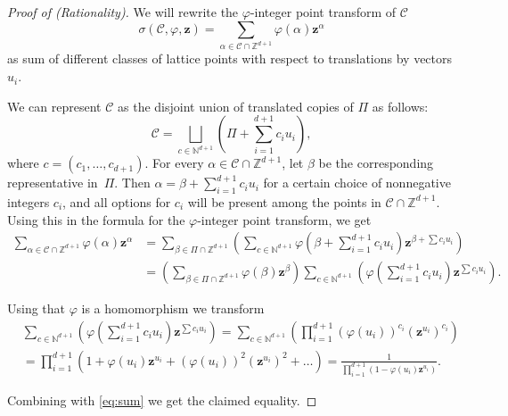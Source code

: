 \documentclass[12pt,reqno]{amsart}
\theoremstyle{definition}
\theoremstyle{remark}
\newcommand{\N}{\mathbb{N}}
\newcommand{\Z}{\mathbb{Z}}
\renewcommand{\phi}{\varphi}
\begin{document}
\begin{proof}[Proof of  (Rationality)] 

We will rewrite the $\phi$-integer point transform of $\mathcal C$ 
$$\sigma(\mathcal C,\phi, \mathbf z)=\sum_{\alpha\in \mathcal C\cap \Z^{d+1}}\phi(\alpha)\mathbf z^{\alpha}$$
as sum of different classes of lattice points with respect to translations by vectors $u_i$.

We can represent $\mathcal C$ as the disjoint union of translated copies of $\Pi$ as follows: 
$$\mathcal C=\bigsqcup_{c\in \N^{d+1}}\left(\Pi+\sum_{i=1}^{d+1} c_iu_i\right),$$ where $c = (c_1,\dots,c_{d+1})$. For every $\alpha\in \mathcal{C}\cap \Z^{d+1}$, let $\beta$ be the corresponding representative in~$\Pi$. Then 
$\alpha=\beta+\sum_{i=1}^{d+1} c_i u_i$
for a certain choice of nonnegative integers $c_i$, and all options for $c_i$ will be present among the points in $\mathcal C\cap \Z^{d+1}$. Using this in the formula for the $\phi$-integer point transform, we get
\begin{equation}\label{eq:sum}\begin{aligned}
    \sum_{\alpha\in \mathcal C\cap \Z^{d+1}}\phi(\alpha)\mathbf z^\alpha &= \sum_{\beta\in \Pi\cap \Z^{d+1}}\left(\sum_{c\in \N^{d+1}}\phi\left(\beta + \sum_{i=1}^{d+1} c_iu_i\right)\mathbf z^{\beta+\sum c_iu_i}\right) \\
    &= \left(\sum_{\beta\in \Pi\cap \Z^{d+1}}\phi(\beta)\mathbf z^\beta\right) \sum_{c\in\N^{d+1}}\left(\phi\left(\sum_{i=1}^{d+1} c_i u_i\right)\mathbf z^{\sum c_iu_i}\right).
\end{aligned}
\end{equation}

Using that $\phi$ is a homomorphism we transform
$$\begin{aligned}
    &\sum_{c \in \N^{d+1}}\left(
    \phi \left(\sum_{i=1}^{d+1} c_i u_i\right)\mathbf z^{\sum c_iu_i}\right)
    = \sum_{c \in \N^{d+1}}\left(\prod_{i=1}^{d+1} (\phi(u_i))^{c_i}(\mathbf z^{u_i})^{c_i} \right)\\
    &=\prod_{i=1}^{d+1}(1+\phi(u_i)\mathbf z^{u_i}+(\phi(u_i))^2(\mathbf z^{u_i})^2+\ldots)=\frac{1}{\prod_{i=1}^{d+1}(1-\phi(u_i)\mathbf z^{u_i})}.
\end{aligned}$$

Combining with \eqref{eq:sum} we get the claimed equality.
\end{proof}
\end{document}
